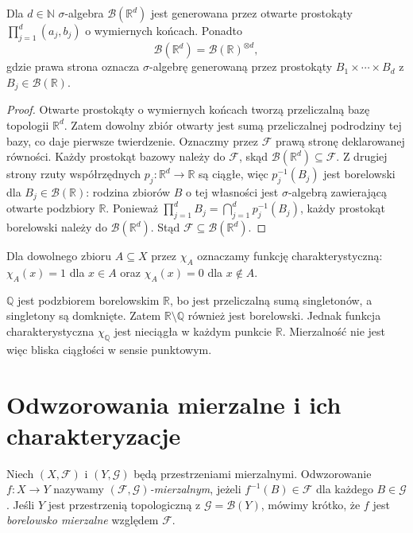 \begin{twierdzenie}
\label{thm:borel-Rd}
Dla $d\in\mathbb N$ $\sigma$-algebra $\mathcal B(\mathbb R^d)$
jest generowana przez otwarte prostokąty
$\prod_{j=1}^d(a_j,b_j)$ o wymiernych końcach. Ponadto
\[
\mathcal B(\mathbb R^d)=\mathcal B(\mathbb R)^{\otimes d},
\]
gdzie prawa strona oznacza $\sigma$-algebrę generowaną przez
prostokąty $B_1\times\cdots\times B_d$ z $B_j\in\mathcal B(\mathbb R)$.
\end{twierdzenie}
\begin{proof}
Otwarte prostokąty o wymiernych końcach tworzą przeliczalną bazę
topologii $\mathbb R^d$. Zatem dowolny zbiór otwarty jest sumą
przeliczalnej podrodziny tej bazy, co daje pierwsze twierdzenie.
Oznaczmy przez $\mathcal F$ prawą stronę deklarowanej równości.
Każdy prostokąt bazowy należy do $\mathcal F$, skąd
$\mathcal B(\mathbb R^d)\subseteq\mathcal F$.
Z drugiej strony rzuty współrzędnych $p_j:\mathbb R^d\to\mathbb R$
są ciągłe, więc $p_j^{-1}(B_j)$ jest borelowski dla
$B_j\in\mathcal B(\mathbb R)$: rodzina zbiorów $B$ o tej
własności jest $\sigma$-algebrą zawierającą otwarte podzbiory
$\mathbb R$. Ponieważ
$\prod_{j=1}^dB_j=\bigcap_{j=1}^dp_j^{-1}(B_j)$,
każdy prostokąt borelowski należy do $\mathcal B(\mathbb R^d)$.
Stąd $\mathcal F\subseteq\mathcal B(\mathbb R^d)$.
\end{proof}

Dla dowolnego zbioru $A\subseteq X$ przez $\chi_A$ oznaczamy
funkcję charakterystyczną: $\chi_A(x)=1$ dla $x\in A$
oraz $\chi_A(x)=0$ dla $x\notin A$.

\begin{przyklad}
$\mathbb Q$ jest podzbiorem borelowskim $\mathbb R$, bo jest
przeliczalną sumą singletonów, a singletony są domknięte.
Zatem $\mathbb R\setminus\mathbb Q$ również jest borelowski.
Jednak funkcja charakterystyczna $\chi_{\mathbb Q}$ jest nieciągła
w każdym punkcie $\mathbb R$. Mierzalność nie jest więc bliska
ciągłości w sensie punktowym.
\end{przyklad}

\section{Odwzorowania mierzalne i ich charakteryzacje}

\begin{definicja}
\label{def:measurable-map}
Niech $(X,\mathcal F)$ i $(Y,\mathcal G)$ będą przestrzeniami
mierzalnymi. Odwzorowanie $f:X\to Y$ nazywamy
\emph{$(\mathcal F,\mathcal G)$-mierzalnym}, jeżeli
$f^{-1}(B)\in\mathcal F$ dla każdego $B\in\mathcal G$.
Jeśli $Y$ jest przestrzenią topologiczną z
$\mathcal G=\mathcal B(Y)$, mówimy krótko, że $f$ jest
\emph{borelowsko mierzalne} względem $\mathcal F$.
\end{definicja}

